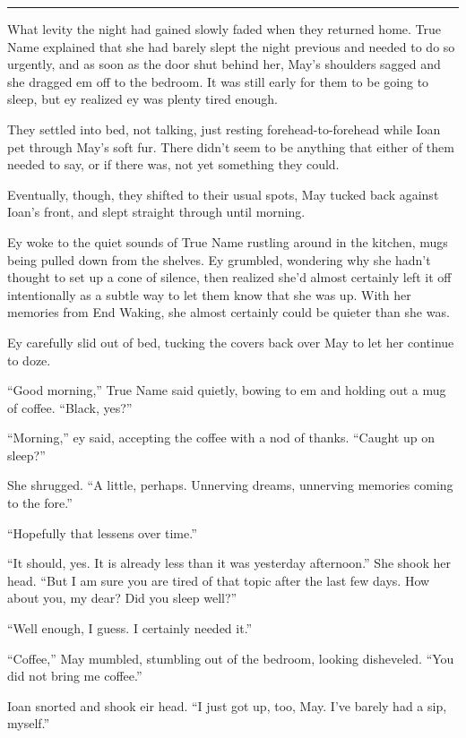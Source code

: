 \begin{center}\rule{0.5\linewidth}{0.5pt}\end{center}

What levity the night had gained slowly faded when they returned home. True Name explained that she had barely slept the night previous and needed to do so urgently, and as soon as the door shut behind her, May's shoulders sagged and she dragged em off to the bedroom. It was still early for them to be going to sleep, but ey realized ey was plenty tired enough.

They settled into bed, not talking, just resting forehead-to-forehead while Ioan pet through May's soft fur. There didn't seem to be anything that either of them needed to say, or if there was, not yet something they could.

Eventually, though, they shifted to their usual spots, May tucked back against Ioan's front, and slept straight through until morning.

Ey woke to the quiet sounds of True Name rustling around in the kitchen, mugs being pulled down from the shelves. Ey grumbled, wondering why she hadn't thought to set up a cone of silence, then realized she'd almost certainly left it off intentionally as a subtle way to let them know that she was up. With her memories from End Waking, she almost certainly could be quieter than she was.

Ey carefully slid out of bed, tucking the covers back over May to let her continue to doze.

``Good morning,'' True Name said quietly, bowing to em and holding out a mug of coffee. ``Black, yes?''

``Morning,'' ey said, accepting the coffee with a nod of thanks. ``Caught up on sleep?''

She shrugged. ``A little, perhaps. Unnerving dreams, unnerving memories coming to the fore.''

``Hopefully that lessens over time.''

``It should, yes. It is already less than it was yesterday afternoon.'' She shook her head. ``But I am sure you are tired of that topic after the last few days. How about you, my dear? Did you sleep well?''

``Well enough, I guess. I certainly needed it.''

``Coffee,'' May mumbled, stumbling out of the bedroom, looking disheveled. ``You did not bring me coffee.''

Ioan snorted and shook eir head. ``I just got up, too, May. I've barely had a sip, myself.''

